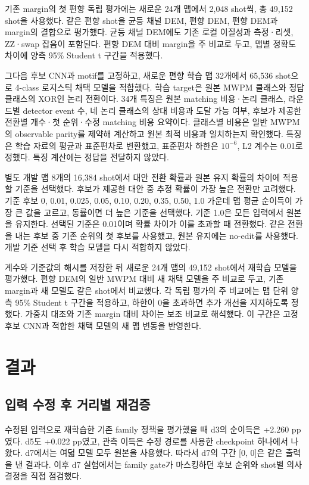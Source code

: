 \documentclass[aps,prd,12pt,twocolumn,superscriptaddress,floatfix]{revtex4-2}
\begin{document}
기존 margin의 첫 편향 독립 평가에는 새로운 24개 맵에서 2,048 shot씩, 총 49,152 shot을 사용했다. 같은 편향 shot을 균등 채널 DEM, 편향 DEM, 편향 DEM과 margin의 결합으로 평가했다. 균등 채널 DEM에도 기존 로컬 이질성과 측정·리셋, ZZ·swap 잡음이 포함된다. 편향 DEM 대비 margin을 주 비교로 두고, 맵별 정확도 차이에 양측 95\% Student t 구간을 적용했다.

그다음 후보 CNN과 motif를 고정하고, 새로운 편향 학습 맵 32개에서 65,536 shot으로 4-class 로지스틱 채택 모델을 적합했다. 학습 target은 원본 MWPM 클래스와 정답 클래스의 XOR인 논리 전환이다. 34개 특징은 원본 matching 비용·논리 클래스, 라운드별 detector event 수, 네 논리 클래스의 상대 비용과 도달 가능 여부, 후보가 제공한 전환별 개수·첫 순위·수정 matching 비용 요약이다. 클래스별 비용은 일반 MWPM의 observable parity를 제약해 계산하고 원본 최적 비용과 일치하는지 확인했다. 특징은 학습 자료의 평균과 표준편차로 변환했고, 표준편차 하한은 \(10^{-6}\), L2 계수는 0.01로 정했다. 특징 계산에는 정답을 전달하지 않았다.

별도 개발 맵 8개의 16,384 shot에서 대안 전환 확률과 원본 유지 확률의 차이에 적용할 기준을 선택했다. 후보가 제공한 대안 중 추정 확률이 가장 높은 전환만 고려했다. 기준 후보 0, 0.01, 0.025, 0.05, 0.10, 0.20, 0.35, 0.50, 1.0 가운데 맵 평균 순이득이 가장 큰 값을 고르고, 동률이면 더 높은 기준을 선택했다. 기준 1.0은 모든 입력에서 원본을 유지한다. 선택된 기준은 0.01이며 확률 차이가 이를 초과할 때 전환했다. 같은 전환을 내는 후보 중 기존 순위의 첫 후보를 사용했고, 원본 유지에는 no-edit를 사용했다. 개발 기준 선택 후 학습 모델을 다시 적합하지 않았다.

계수와 기준값의 해시를 저장한 뒤 새로운 24개 맵의 49,152 shot에서 재학습 모델을 평가했다. 편향 DEM의 일반 MWPM 대비 새 채택 모델을 주 비교로 두고, 기존 margin과 새 모델도 같은 shot에서 비교했다. 각 독립 평가의 주 비교에는 맵 단위 양측 95\% Student t 구간을 적용하고, 하한이 0을 초과하면 추가 개선을 지지하도록 정했다. 가중치 대조와 기존 margin 대비 차이는 보조 비교로 해석했다. 이 구간은 고정 후보 CNN과 적합한 채택 모델의 새 맵 변동을 반영한다.

\section{결과}

\subsection{입력 수정 후 거리별 재검증}

수정된 입력으로 재학습한 기존 family 정책을 평가했을 때 d3의 순이득은 +2.260 pp였다. d5도 +0.022 pp였고, 관측 이득은 수정 경로를 사용한 checkpoint 하나에서 나왔다. d7에서는 여덟 모델 모두 원본을 사용했다. 따라서 d7의 구간 [0, 0]은 같은 출력을 낸 결과다. 이후 d7 실험에서는 family gate가 마스킹하던 후보 순위와 shot별 의사결정을 직접 점검했다.
\end{document}
